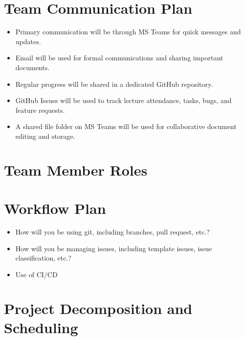 \documentclass{article}
\begin{document}
\section{Team Communication Plan}

\begin{itemize}
  \item Primary communication will be through MS Teams for quick messages and updates.
  \item Email will be used for formal communications and sharing important documents.
  \item Regular progress will be shared in a dedicated GitHub repository.
  \item GitHub Issues will be used to track lecture attendance, tasks, bugs, and feature requests.
  \item A shared file folder on MS Teams will be used for collaborative document editing and storage.
\end{itemize}

\section{Team Member Roles}





\section{Workflow Plan}

\begin{itemize}
	\item How will you be using git, including branches, pull request, etc.?
	\item How will you be managing issues, including template issues, issue
	classification, etc.?
  \item Use of CI/CD
\end{itemize}

\section{Project Decomposition and Scheduling}
\end{document}

